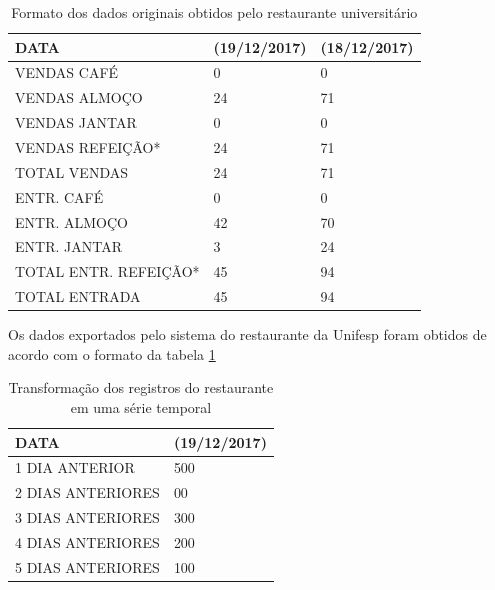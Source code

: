         	\begin{table}[!ht]
        	    \centering
                \begin{tabular}{|l|l|l|}
                    \hline
                    DATA                  & (19/12/2017) & (18/12/2017) \\ \hline
                    VENDAS CAFÉ           & 0            & 0            \\
                    VENDAS ALMOÇO         & 24           & 71           \\
                    VENDAS JANTAR         & 0            & 0            \\
                    VENDAS REFEIÇÃO*      & 24           & 71           \\
                    TOTAL VENDAS          & 24           & 71           \\
                    ENTR. CAFÉ            & 0            & 0            \\
                    ENTR. ALMOÇO          & 42           & 70           \\
                    ENTR. JANTAR          & 3            & 24           \\
                    TOTAL ENTR. REFEIÇÃO* & 45           & 94           \\
                    TOTAL ENTRADA         & 45           & 94           \\ \hline
                \end{tabular}
                \caption{Formato dos dados originais obtidos pelo restaurante universitário}
                \label{table:dadosrestaurante}
            \end{table}
            Os dados exportados pelo sistema do restaurante da Unifesp foram obtidos de acordo com o formato da tabela \ref{table:dadosrestaurante}\\
            
            \begin{table}[!ht]
                \centering
                \begin{tabular}{|l|l|}
                \hline
                    DATA                  & (19/12/2017) \\ \hline
                1 DIA ANTERIOR    & 500        \\
                2 DIAS ANTERIORES & 00                            \\
                3 DIAS ANTERIORES & 300                            \\
                4 DIAS ANTERIORES & 200                            \\
                5 DIAS ANTERIORES & 100                          \\ \hline 
                \end{tabular}
                \caption{Transformação dos registros do restaurante em uma série temporal}
                \label{table:transformacaodadosrestaurante}
            \end{table}
            
